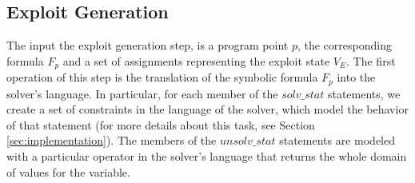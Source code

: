 \subsection{Exploit Generation}
The input the exploit generation step, is a program point $p$, the corresponding formula $F_p$ and a set of assignments representing the exploit state $V_E$. The first operation of this step is the translation of the symbolic formula $F_p$ into the solver's language. In particular, for each member of the $solv\_stat$ statements, we create a set of constraints in the language of the solver, which model the behavior of that statement (for more details about this task, see Section \ref{sec:implementation}). The members of the $unsolv\_stat$ statements are modeled with a particular operator in the solver's language that returns the whole domain of values for the variable.





